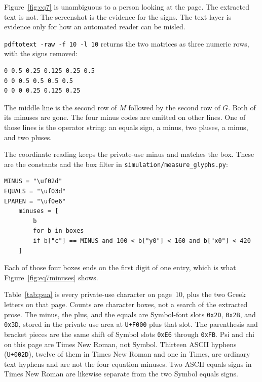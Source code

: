 \documentclass[11pt]{article}
\begin{document}
Figure~\ref{fig:eq7} is unambiguous to a person looking at the page. The
extracted text is not. The screenshot is the evidence for the signs. The
text layer is evidence only for how an automated reader can be misled.

\texttt{pdftotext -raw -f 10 -l 10} returns the two matrices as three
numeric rows, with the signs removed:
\begin{verbatim}
0 0.5 0.25 0.125 0.25 0.5
0 0 0.5 0.5 0.5 0.5
0 0 0 0.25 0.125 0.25
\end{verbatim}
The middle line is the second row of $M$ followed by the second row of $G$.
Both of its minuses are gone. The four minus codes are emitted on other
lines. One of those lines is the operator string: an equals sign, a minus,
two pluses, a minus, and two pluses.

The coordinate reading keeps the private-use minus and matches the box.
These are the constants and the box filter in
\texttt{simulation/measure\_glyphs.py}:
\begin{lstlisting}
MINUS = "\uf02d"
EQUALS = "\uf03d"
LPAREN = "\uf0e6"
    minuses = [
        b
        for b in boxes
        if b["c"] == MINUS and 100 < b["y0"] < 160 and b["x0"] < 420
    ]
\end{lstlisting}
Each of those four boxes ends on the first digit of one entry, which is
what Figure~\ref{fig:eq7minuses} shows.

Table~\ref{tab:pua} is every private-use character on page~10, plus the two
Greek letters on that page. Counts are character boxes, not a search of
the extracted prose. The minus, the plus, and the equals are Symbol-font
slots \texttt{0x2D}, \texttt{0x2B}, and \texttt{0x3D}, stored in the
private use area at \texttt{U+F000} plus that slot. The parenthesis and
bracket pieces are the same shift of Symbol slots \texttt{0xE6} through
\texttt{0xFB}. Psi and chi on this page are Times New Roman, not Symbol.
Thirteen ASCII hyphens (\texttt{U+002D}), twelve of them in Times New Roman
and one in Times, are ordinary text hyphens and are not the four equation
minuses. Two ASCII equals signs in Times New Roman are likewise separate
from the two Symbol equals signs.
\end{document}
